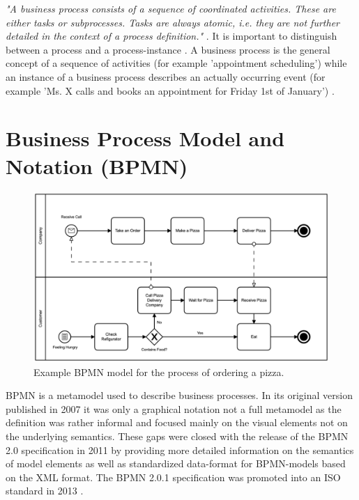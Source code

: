 \documentclass[a4paper,11pt]{article}
\begin{document}
\textit{"A business process consists of a sequence of coordinated activities.
  These are either tasks or subprocesses. Tasks are always atomic, i.e. they
  are not further detailed in the context of a process definition."}
\cite[p. 1]{bpmn20}. It is important to distinguish between a process and a
process-instance \cite{BPMN}. A business process is the general concept of a
sequence of activities (for example 'appointment scheduling') while an
instance of a business process describes an actually occurring event (for
example 'Ms. X calls and books an appointment for Friday 1st of January')
\cite{alfwi}.

\section{Business Process Model and Notation (BPMN)}
\begin{figure}[H]
  \begin{center}
    \includegraphics[width=1\textwidth]{PizzaOrder.png}
  \end{center}
  \caption{Example BPMN model for the process of ordering a pizza.}
  \label{fig:length_eight_mouse}
\end{figure}

BPMN is a metamodel used to describe business processes. In its original
version published in 2007 it was only a graphical notation not a full
metamodel as the definition was rather informal and focused mainly on the
visual elements not on the underlying semantics. These gaps were closed with
the release of the BPMN 2.0 specification in 2011 by providing more detailed
information on the semantics of model elements as well as standardized
data-format for BPMN-models based on the XML format.  The BPMN 2.0.1
specification was promoted into an ISO standard in 2013 \cite{iso}.
	
\end{document}
